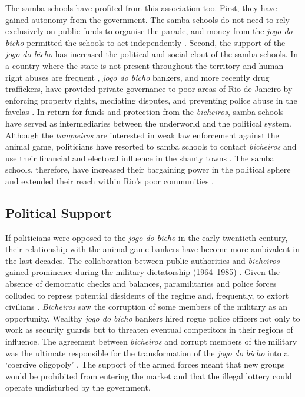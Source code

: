 \documentclass[a4paper,12pt]{article}
\begin{document}
The samba schools have profited from this association too. First, they have gained autonomy from the government. The samba schools do not need to rely exclusively on public funds to organise the parade, and money from the \emph{jogo do bicho} permitted the schools to act independently \citep[209]{chinelli1993vazio}. Second, the support of the \emph{jogo do bicho} has increased the political and social clout of the samba schools. In a country where the state is not present throughout the territory and human right abuses are frequent \citep{odonnell1993state,pinheiro2000}, \emph{jogo do bicho} bankers, and more recently drug traffickers, have provided private governance to poor areas of Rio de Janeiro by enforcing property rights, mediating disputes, and preventing police abuse in the favelas \citep{arias2006dynamics,goldstein2013laughter}. In return for funds and protection from the \emph{bicheiros}, samba schools have served as intermediaries between the underworld and the political system. Although the \emph{banqueiros} are interested in weak law enforcement against the animal game, politicians have resorted to samba schools to contact \emph{bicheiros} and use their financial and electoral influence in the shanty towns \citep[17]{misse2011crime}. The samba schools, therefore, have increased their bargaining power in the political sphere and extended their reach within Rio's poor communities \citep[215]{chinelli1993vazio}.

\subsection{Political Support}
\label{sub:support}

If politicians were opposed to the \emph{jogo do bicho} in the early twentieth century, their relationship with the animal game bankers have become more ambivalent in the last decades. The collaboration between public authorities and \emph{bicheiros} gained prominence during the military dictatorship (1964--1985) \citep{gaspari2002ditadura,jupiara2015poroes}. Given the absence of democratic checks and balances, paramilitaries and police forces colluded to repress potential dissidents of the regime and, frequently, to extort civilians \citep{magalhaes1997logica,misse2009acumulaccao}. \emph{Bicheiros} saw the corruption of some members of the military as an opportunity. Wealthy \emph{jogo do bicho} bankers hired rogue police officers not only to work as security guards but to threaten eventual competitors in their regions of influence. The agreement between \emph{bicheiros} and corrupt members of the military was the ultimate responsible for the transformation of the \emph{jogo do bicho} into a `coercive oligopoly' \citep{jupiara2015poroes}. The support of the armed forces meant that new groups would be prohibited from entering the market and that the illegal lottery could operate undisturbed by the government.
\end{document}
